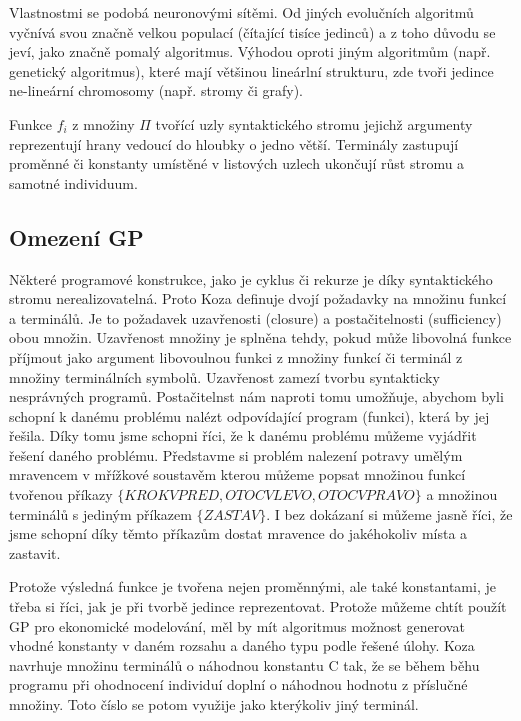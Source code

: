 \documentclass[bc,male,java,dept460]{diploma}		%
\begin{document}
Vlastnostmi se podobá neuronovými sítěmi. Od jiných evolučních algoritmů vyčnívá svou značně velkou populací (čítající tisíce jedinců) a z toho důvodu se jeví, jako značně pomalý algoritmus. Výhodou oproti jiným algoritmům (např. genetický algoritmus), které mají většinou lineárlní strukturu, zde tvoři jedince ne-lineární chromosomy (např. stromy či grafy).


Funkce $f_i$ z množiny $\Pi$ tvořící uzly syntaktického stromu jejichž argumenty reprezentují hrany vedoucí do hloubky o jedno větší. Terminály zastupují proměnné či konstanty umístěné v listových uzlech ukončují růst stromu a samotné individuum.

\subsection{Omezení GP}
Některé programové konstrukce, jako je cyklus či rekurze je díky syntaktického stromu nerealizovatelná. Proto Koza definuje \cite{kozagp} dvojí požadavky na množinu funkcí a terminálů. Je to požadavek uzavřenosti (closure) a postačitelnosti (sufficiency) obou množin. Uzavřenost množiny je splněna tehdy, pokud může libovolná funkce příjmout jako argument libovoulnou funkci z množiny funkcí či terminál z množiny terminálních symbolů. Uzavřenost zamezí tvorbu syntakticky nesprávných programů.
Postačitelnst nám naproti tomu umožňuje, abychom byli schopní k danému problému nalézt odpovídající program (funkci), která by jej řešila. Díky tomu jsme schopni říci, že k danému problému můžeme vyjádřit řešení daného problému. Představme si problém nalezení potravy umělým mravencem v mřížkové soustavěm kterou můžeme popsat množinou funkcí tvořenou příkazy $\{KROK VPRED, OTOC VLEVO, OTOC VPRAVO\}$ a množinou terminálů s jediným příkazem $\{ZASTAV\}$. I bez dokázaní si můžeme jasně říci, že jsme schopní díky těmto příkazům dostat mravence do jakéhokoliv místa a zastavit.

Protože výsledná funkce je tvořena nejen proměnnými, ale také konstantami, je třeba si říci, jak je při tvorbě jedince reprezentovat. Protože můžeme chtít použít GP pro ekonomické modelování, měl by mít algoritmus možnost generovat vhodné konstanty v daném rozsahu a daného typu podle řešené úlohy. Koza navrhuje množinu terminálů o náhodnou konstantu C tak, že se během běhu programu při ohodnocení individuí doplní o náhodnou hodnotu z příslučné množiny. Toto číslo se potom využije jako kterýkoliv jiný terminál.
\end{document}
